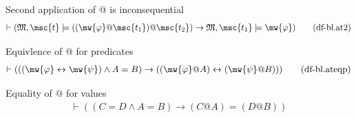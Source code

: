 \begin{metadefinition} {Second application of @ is
inconsequential}
\begin{align}
\vdash ( \mathfrak{M} , \msc{t} \models ( ( \mw{\varphi} @ \msc{t_1} ) @
    \msc{t_2} ) \rightarrow \mathfrak{M} , \msc{t_1} \models \mw{\varphi}
    )\label{eq:df-bl.at2}\tag{df-bl.at2}
\end{align}
\end{metadefinition}


\begin{metadefinition} {Equivlence of @ for predicates}
\begin{align}
\vdash ( ( ( \mw{\varphi} \leftrightarrow \mw{\psi} ) \wedge A = B )
    \rightarrow ( ( \mw{\varphi} @ A ) \leftrightarrow ( \mw{\psi} @ B ) )
    )\label{eq:df-bl.ateqp}\tag{df-bl.ateqp}
\end{align}
\end{metadefinition}


\begin{metadefinition} {Equality of @ for values}
\begin{align}
\vdash ( ( C = D \wedge A = B ) \rightarrow ( C @ A ) = ( D @ B )
    )\label{eq:df-bl.ateqv}\tag{df-bl.ateqv}
\end{align}
\end{metadefinition}

